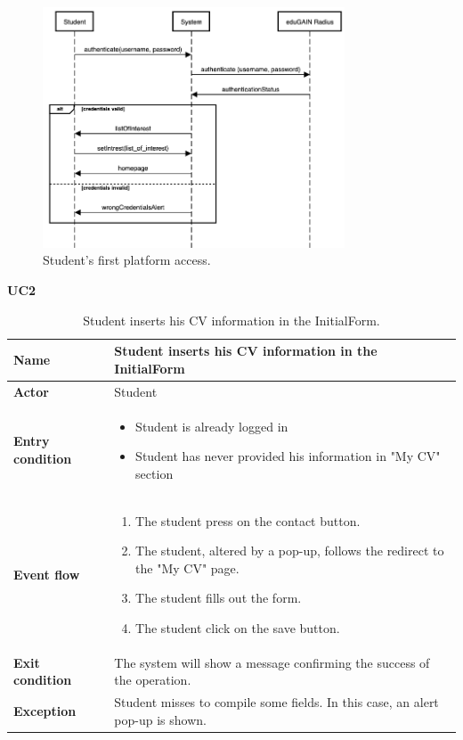     \begin{figure}[H]
        \centering
        \includegraphics[width=0.8\textwidth]{Assets/SequenceDiagrams/1-login.png}
        \caption{Student's first platform access.}
        \label{fig:Student's first platform access}
    \end{figure}


    \textbf{UC2}
    \nopagebreak
    \begin{table}[H]
    \centering
    \begin{tabular}{|l|p{11.9cm}|}
        \hline
        \textbf{Name}            & Student inserts his CV information in the InitialForm
        \\\hline
        \textbf{Actor}           & Student         \\\hline
        \textbf{Entry condition} &
        \begin{itemize}
              \item Student is already logged in
              \item Student has never provided his information in "My CV" section
        \end{itemize}                                        \\\hline
        \textbf{Event flow}      &
        \begin{enumerate}[label=\arabic*.]
            \item The student press on the contact button.
            \item The student, altered by a pop-up, follows the redirect to the "My CV" page.
            \item The student fills out the form.
            \item The student click on the save button.
        \end{enumerate}            \\\hline
        \textbf{Exit condition}  & The system will show a message confirming the success of the operation.\\\hline
        
        \textbf{Exception}       &  Student misses to compile some fields. In this case, an alert pop-up is shown.  \\\hline
    \end{tabular}
    \caption{Student inserts his CV information in the InitialForm.}
    \label{table:Student inserts his CV information in the InitialForm}
    \end{table}

